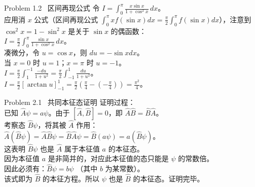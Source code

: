 \documentclass[a4paper,11pt]{article}
\begin{document}
\begin{solution}{Problem 1.2 \textbar\ 区间再现公式}
令 $I = \int_0^\pi \frac{x \sin x}{1 + \cos^2 x} \, dx$。\\
应用消 $x$ 公式（区间再现公式 $\int_0^\pi x f(\sin x)dx = \frac{\pi}{2} \int_0^\pi f(\sin x)dx$），注意到 $\cos^2 x = 1 - \sin^2 x$ 是关于 $\sin x$ 的偶函数：\\
$I = \frac{\pi}{2} \int_0^\pi \frac{\sin x}{1 + \cos^2 x} \, dx$。\\
凑微分，令 $u = \cos x$，则 $du = -\sin x dx$。\\
当 $x=0$ 时 $u=1$；$x=\pi$ 时 $u=-1$。\\
$I = \frac{\pi}{2} \int_1^{-1} \frac{-du}{1 + u^2} = \frac{\pi}{2} \int_{-1}^1 \frac{du}{1 + u^2}$。\\
$I = \frac{\pi}{2} [\arctan u]_{-1}^1 = \frac{\pi}{2} (\frac{\pi}{4} - (-\frac{\pi}{4})) = \frac{\pi^2}{4}$。
\end{solution}

\begin{solution}{Problem 2.1 \textbar\ 共同本征态证明}
证明过程：\\
已知 $\hat{A}\psi = a\psi$。由于 $[\hat{A}, \hat{B}] = 0$，即 $\hat{A}\hat{B} = \hat{B}\hat{A}$。\\
考察态 $\hat{B}\psi$，将其被 $\hat{A}$ 作用：\\
$\hat{A}(\hat{B}\psi) = \hat{A}\hat{B}\psi = \hat{B}\hat{A}\psi = \hat{B}(a\psi) = a(\hat{B}\psi)$。\\
这表明 $\hat{B}\psi$ 也是 $\hat{A}$ 属于本征值 $a$ 的本征态。\\
因为本征值 $a$ 是非简并的，对应此本征值的态只能是 $\psi$ 的常数倍。\\
因此必须有：$\hat{B}\psi = b\psi$ （其中 $b$ 为某常数）。\\
该式即为 $\hat{B}$ 的本征方程。所以 $\psi$ 也是 $\hat{B}$ 的本征态。证明完毕。
\end{solution}
\end{document}
